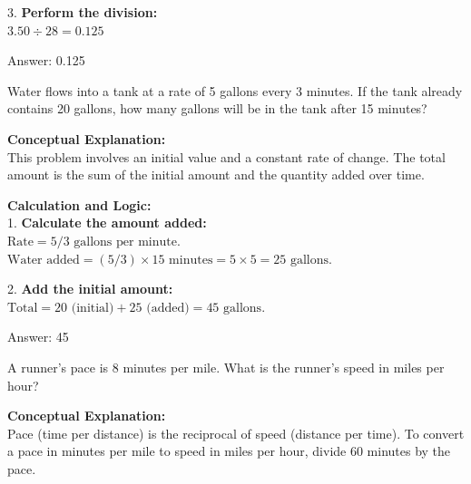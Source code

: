 \documentclass[11pt,paper=a4,answers]{exam}
\begin{document}
\begin{questions}
\begin{solution}
\vspace{15pt}

3. \textbf{Perform the division:} \\
$3.50 \div 28 = 0.125$

\vspace{30pt}

Answer: \colorbox{yellow!100}{0.125}
\end{solution}

\vspace{60pt}

\question
Water flows into a tank at a rate of 5 gallons every 3 minutes. If the tank already contains 20 gallons, how many gallons will be in the tank after 15 minutes?

\begin{solution}
\textbf{Conceptual Explanation:} \\
This problem involves an initial value and a constant rate of change. The total amount is the sum of the initial amount and the quantity added over time.

\vspace{30pt}

\textbf{Calculation and Logic:} \\
1. \textbf{Calculate the amount added:} \\
$\text{Rate} = 5/3 \text{ gallons per minute}$. \\
$\text{Water added} = (5/3) \times 15 \text{ minutes} = 5 \times 5 = 25 \text{ gallons}$.

\vspace{15pt}

2. \textbf{Add the initial amount:} \\
$\text{Total} = 20 \text{ (initial)} + 25 \text{ (added)} = 45 \text{ gallons}$.

\vspace{30pt}

Answer: \colorbox{yellow!100}{45}
\end{solution}

\vspace{60pt}

\question
A runner's pace is 8 minutes per mile. What is the runner's speed in miles per hour?

\begin{solution}
\textbf{Conceptual Explanation:} \\
Pace (time per distance) is the reciprocal of speed (distance per time). To convert a pace in minutes per mile to speed in miles per hour, divide 60 minutes by the pace.


\end{solution}
\end{questions}
\end{document}
